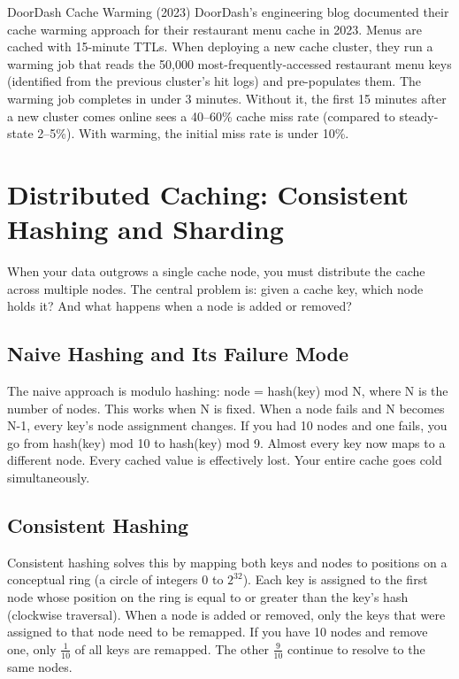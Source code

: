 \documentclass[11pt,a4paper]{article}
\begin{document}
\begin{industrybox}{DoorDash Cache Warming (2023)}
DoorDash's engineering blog documented their cache warming approach for their restaurant menu cache in 2023. Menus are cached with 15-minute TTLs. When deploying a new cache cluster, they run a warming job that reads the 50,000 most-frequently-accessed restaurant menu keys (identified from the previous cluster's hit logs) and pre-populates them. The warming job completes in under 3 minutes. Without it, the first 15 minutes after a new cluster comes online sees a 40--60\% cache miss rate (compared to steady-state 2--5\%). With warming, the initial miss rate is under 10\%.
\end{industrybox}

\section{Distributed Caching: Consistent Hashing and Sharding}

When your data outgrows a single cache node, you must distribute the cache across multiple nodes. The central problem is: given a cache key, which node holds it? And what happens when a node is added or removed?

\subsection{Naive Hashing and Its Failure Mode}

The naive approach is modulo hashing: node = hash(key) mod N, where N is the number of nodes. This works when N is fixed. When a node fails and N becomes N-1, every key's node assignment changes. If you had 10 nodes and one fails, you go from hash(key) mod 10 to hash(key) mod 9. Almost every key now maps to a different node. Every cached value is effectively lost. Your entire cache goes cold simultaneously.

\subsection{Consistent Hashing}

Consistent hashing solves this by mapping both keys and nodes to positions on a conceptual ring (a circle of integers 0 to $2^{32}$). Each key is assigned to the first node whose position on the ring is equal to or greater than the key's hash (clockwise traversal). When a node is added or removed, only the keys that were assigned to that node need to be remapped. If you have 10 nodes and remove one, only $\frac{1}{10}$ of all keys are remapped. The other $\frac{9}{10}$ continue to resolve to the same nodes.
\end{document}
